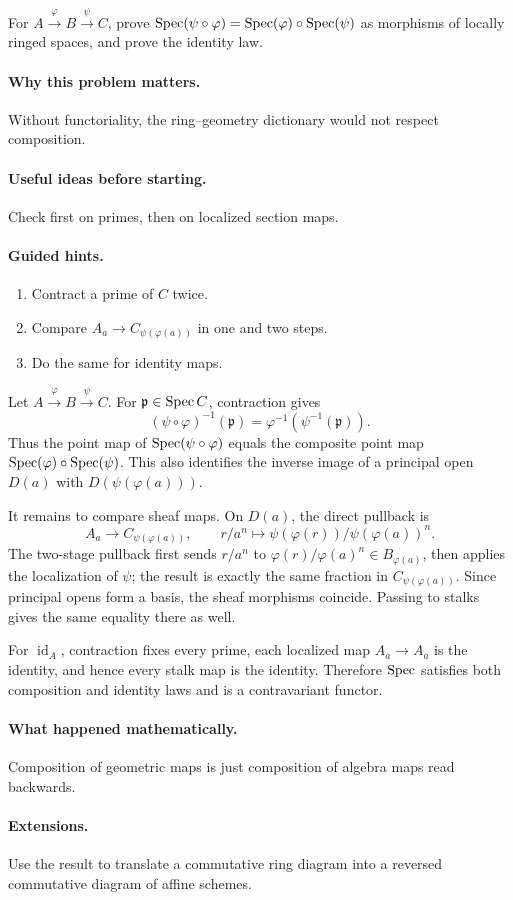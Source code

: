 \begin{problem}\label{prob:vi19-p03}
For $A\xrightarrow{\varphi}B\xrightarrow{\psi}C$, prove $\operatorname{Spec}(\psi\circ\varphi)=\operatorname{Spec}(\varphi)\circ\operatorname{Spec}(\psi)$ as morphisms of locally ringed spaces, and prove the identity law.
\end{problem}

\ifdefined\FullProblemDossiers
\paragraph{Why this problem matters.}
Without functoriality, the ring--geometry dictionary would not respect composition.

\paragraph{Useful ideas before starting.}
Check first on primes, then on localized section maps.

\paragraph{Guided hints.}
\begin{enumerate}
\item Contract a prime of $C$ twice.
\item Compare $A_a\to C_{\psi(\varphi(a))}$ in one and two steps.
\item Do the same for identity maps.
\end{enumerate}

\begin{solution}
Let \(A\xrightarrow{\varphi}B\xrightarrow{\psi}C\).  For \(\mathfrak p\in\operatorname{Spec} C\), contraction gives
\[
(\psi\circ\varphi)^{-1}(\mathfrak p)
=\varphi^{-1}(\psi^{-1}(\mathfrak p)).
\]
Thus the point map of \(\operatorname{Spec}(\psi\circ\varphi)\) equals the composite point map \(\operatorname{Spec}(\varphi)\circ\operatorname{Spec}(\psi)\).  This also identifies the inverse image of a principal open \(D(a)\) with \(D(\psi(\varphi(a)))\).

It remains to compare sheaf maps.  On \(D(a)\), the direct pullback is
\[
A_a\to C_{\psi(\varphi(a))},
\qquad
r/a^n\longmapsto
\psi(\varphi(r))/\psi(\varphi(a))^n.
\]
The two-stage pullback first sends \(r/a^n\) to \(\varphi(r)/\varphi(a)^n\in B_{\varphi(a)}\), then applies the localization of \(\psi\); the result is exactly the same fraction in \(C_{\psi(\varphi(a))}\).  Since principal opens form a basis, the sheaf morphisms coincide.  Passing to stalks gives the same equality there as well.

For \(\operatorname{id}_A\), contraction fixes every prime, each localized map \(A_a\to A_a\) is the identity, and hence every stalk map is the identity.  Therefore \(\operatorname{Spec}\) satisfies both composition and identity laws and is a contravariant functor.
\end{solution}

\paragraph{What happened mathematically.}
Composition of geometric maps is just composition of algebra maps read backwards.

\paragraph{Extensions.}
Use the result to translate a commutative ring diagram into a reversed commutative diagram of affine schemes.
\fi
